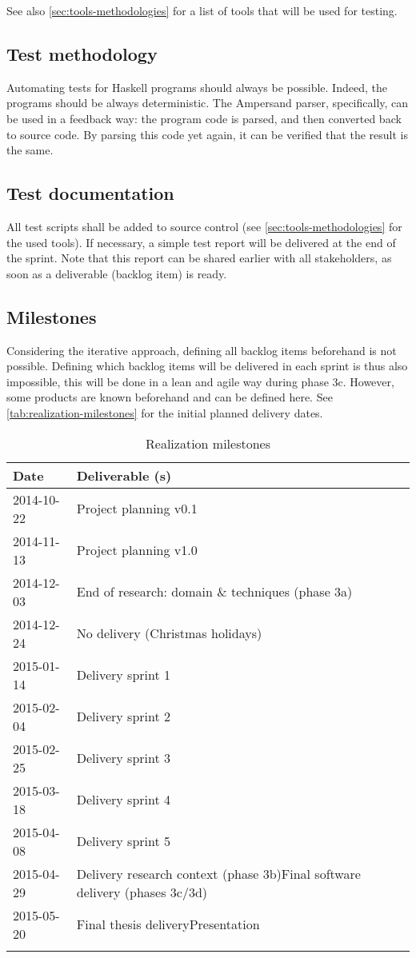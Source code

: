 See also \autoref{sec:tools-methodologies} for a list of tools that will be used for testing.

\subsection{Test methodology}
Automating tests for Haskell programs should always be possible.
Indeed, the programs should be always deterministic.
The Ampersand parser, specifically, can be used in a feedback way: the program code is parsed, and then converted back to source code.
By parsing this code yet again, it can be verified that the result is the same.

\subsection{Test documentation}
\label{subsec:test-documentation}
All test scripts shall be added to source control (see \autoref{sec:tools-methodologies} for the used tools).
If necessary, a simple test report will be delivered at the end of the sprint.
Note that this report can be shared earlier with all stakeholders, as soon as a deliverable (backlog item) is ready.

\subsection{Milestones}
Considering the iterative approach, defining all backlog items beforehand is not possible.
Defining which backlog items will be delivered in each sprint is thus also impossible, this will be done in a lean and agile way during phase 3c.
However, some products are known beforehand and can be defined here.
See \autoref{tab:realization-milestones} for the initial planned delivery dates.
%
\begin{longtable}{|l|l|}\hline
    \textbf{Date} & \textbf{Deliverable (s)} \\\hline
	\endhead
    2014-10-22 & Project planning v0.1 \\\hline
    2014-11-13 & Project planning v1.0 \\\hline
    2014-12-03 & End of research: domain \& techniques (phase 3a) \\\hline
    2014-12-24 & No delivery (Christmas holidays) \\\hline
    2015-01-14 & Delivery sprint 1\\\hline
    2015-02-04 & Delivery sprint 2\\\hline
    2015-02-25 & Delivery sprint 3\\\hline
    2015-03-18 & Delivery sprint 4\\\hline
    2015-04-08 & Delivery sprint 5\\\hline
    2015-04-29 & Delivery research context (phase 3b)\newline{}Final software delivery (phases 3c/3d)\\\hline
    2015-05-20 & Final thesis delivery\newline{}Presentation\\\hline
  \caption{Realization milestones}
  \label{tab:realization-milestones}
\end{longtable}